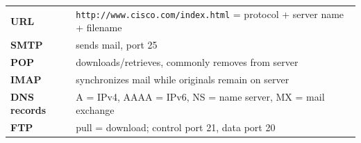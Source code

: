 \documentclass[9pt]{article}
\begin{document}
{\begin{center}
\begin{tikzpicture}[>=Latex, node distance=.85cm, every node/.style={font=\scriptsize, align=center}]
\end{tikzpicture}
\end{center}
\begin{tabularx}{\linewidth}{@{}>{\bfseries}l X@{}}
URL & \texttt{http://www.cisco.com/index.html} = protocol + server name + filename \\
SMTP & sends mail, port 25 \\
POP & downloads/retrieves, commonly removes from server \\
IMAP & synchronizes mail while originals remain on server \\
DNS records & A = IPv4, AAAA = IPv6, NS = name server, MX = mail exchange \\
FTP & pull = download; control port 21, data port 20 \\
\end{tabularx}
}
\end{document}
